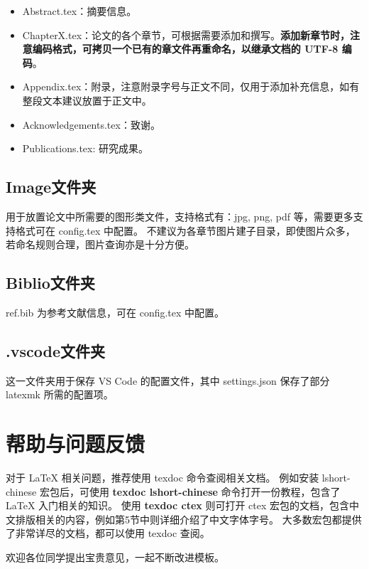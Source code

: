 \begin{itemize}
    \item Abstract.tex：摘要信息。
    \item ChapterX.tex：论文的各个章节，可根据需要添加和撰写。\textbf{添加新章节时，注意编码格式，可拷贝一个已有的章文件再重命名，以继承文档的 UTF-8 编码}。
    \item Appendix.tex：附录，注意附录字号与正文不同，仅用于添加补充信息，如有整段文本建议放置于正文中。
    \item Acknowledgements.tex：致谢。
    \item Publications.tex: 研究成果。
\end{itemize}

\subsection{Image文件夹}

用于放置论文中所需要的图形类文件，支持格式有：jpg, png, pdf 等，需要更多支持格式可在 config.tex 中配置。
不建议为各章节图片建子目录，即使图片众多，若命名规则合理，图片查询亦是十分方便。

\subsection{Biblio文件夹}

ref.bib 为参考文献信息，可在 config.tex 中配置。

\subsection{.vscode文件夹}

这一文件夹用于保存 VS Code 的配置文件，其中 settings.json 保存了部分 latexmk 所需的配置项。



\section{帮助与问题反馈}\label{sec:help}

对于 \LaTeX{} 相关问题，推荐使用 texdoc 命令查阅相关文档。
例如安装 lshort-chinese 宏包后，可使用 \textbf{texdoc lshort-chinese} 命令打开一份教程，包含了 \LaTeX{} 入门相关的知识。
使用 \textbf{texdoc ctex} 则可打开 ctex 宏包的文档，包含中文排版相关的内容，例如第5节中则详细介绍了中文字体字号。
大多数宏包都提供了非常详尽的文档，都可以使用 texdoc 查阅。

欢迎各位同学提出宝贵意见，一起不断改进模板。
